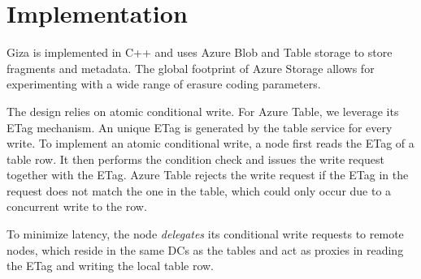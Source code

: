 \section{Implementation}
\label{sec:impl}

Giza is implemented in C++ and uses Azure Blob and Table storage to store fragments and metadata.
The global footprint of Azure Storage allows for experimenting with a wide range of erasure coding parameters.

The \name design relies on atomic conditional write.
For Azure Table, we leverage its ETag mechanism. An unique ETag 
is generated by the table service for every write. To implement an atomic
conditional write, a \name node first reads the ETag of a table row.
It then performs the condition check and issues the
write request together with the ETag. Azure Table rejects the
write request if the ETag in the request does not match the one in the table,
which could only occur due to a concurrent write to the row.

To minimize latency, the \name node \emph{delegates} its conditional write requests
to remote \name nodes, which reside in the same DCs as the tables and act as proxies
in reading the ETag and writing the local table row.



